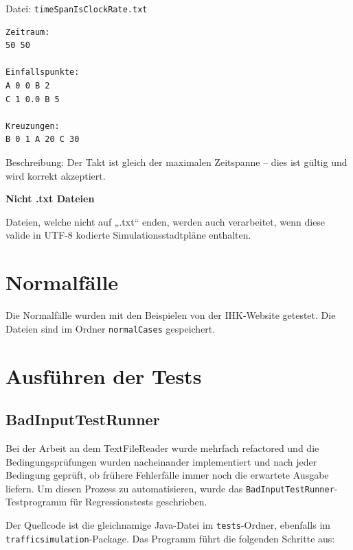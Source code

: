Datei: \texttt{timeSpanIsClockRate.txt}
\begin{lstlisting}
Zeitraum:
50 50

Einfallspunkte:
A 0 0 B 2
C 1 0.0 B 5

Kreuzungen:
B 0 1 A 20 C 30
\end{lstlisting}

Beschreibung: Der Takt ist gleich der maximalen Zeitspanne – dies ist gültig und wird korrekt akzeptiert.

\textbf{Nicht .txt Dateien}

Dateien, welche nicht auf „.txt“ enden, werden auch verarbeitet, wenn diese valide in UTF-8 kodierte Simulationsstadtpläne enthalten.

\section{Normalfälle}
Die Normalfälle wurden mit den Beispielen von der IHK-Website getestet.
Die Dateien sind im Ordner \texttt{normalCases} gespeichert.

\section{Ausführen der Tests}

\subsection{BadInputTestRunner}

Bei der Arbeit an dem TextFileReader wurde mehrfach refactored und die Bedingungsprüfungen wurden nacheinander implementiert und nach jeder Bedingung geprüft, 
ob frühere Fehlerfälle immer noch die erwartete Ausgabe liefern. 
Um diesen Prozess zu automatisieren, wurde das \texttt{BadInputTestRunner}-Testprogramm für Regressionstests geschrieben.

Der Quellcode ist die gleichnamige Java-Datei im \texttt{tests}-Ordner, ebenfalls im \\
\texttt{trafficsimulation}-Package. 
Das Programm führt die folgenden Schritte aus:


